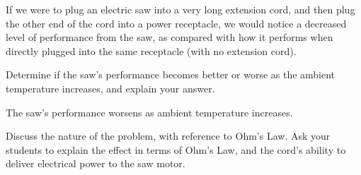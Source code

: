 

If we were to plug an electric saw into a very long extension cord, and then plug the other end of the cord into a power receptacle, we would notice a decreased level of performance from the saw, as compared with how it performs when directly plugged into the same receptacle (with no extension cord).

Determine if the saw's performance becomes better or worse as the ambient temperature increases, and explain your answer.







The saw's performance worsens as ambient temperature increases.







Discuss the nature of the problem, with reference to Ohm's Law.  Ask your students to explain the effect in terms of Ohm's Law, and the cord's ability to deliver electrical power to the saw motor.





